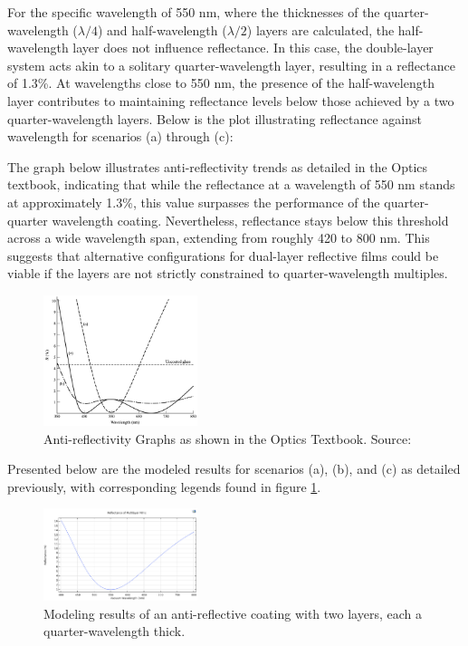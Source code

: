 For the specific wavelength of 550 nm, where the thicknesses of the quarter-wavelength ($\lambda/4$) and half-wavelength ($\lambda/2$) layers are calculated, the half-wavelength layer does not influence reflectance. In this case, the double-layer system acts akin to a solitary quarter-wavelength layer, resulting in a reflectance of 1.3\%. At wavelengths close to 550 nm, the presence of the half-wavelength layer contributes to maintaining reflectance levels below those achieved by a two quarter-wavelength layers. Below is the plot illustrating reflectance against wavelength for scenarios (a) through (c):

The graph below illustrates anti-reflectivity trends as detailed in the Optics textbook, indicating that while the reflectance at a wavelength of 550 nm stands at approximately 1.3\%, this value surpasses the performance of the quarter-quarter wavelength coating. Nevertheless, reflectance stays below this threshold across a wide wavelength span, extending from roughly 420 to 800 nm. This suggests that alternative configurations for dual-layer reflective films could be viable if the layers are not strictly constrained to quarter-wavelength multiples.

\begin{figure}[ht!]
  \centering
  \includegraphics[width=0.4\textwidth]{Chapters/Figures/Chapter 4 Figures/Antireflectivity Graphs in the Optics Book.png}
  \caption{Anti-reflectivity Graphs as shown in the Optics Textbook. Source: \cite{pedrotti_introduction_2007}}
  \label{fig:antireflectivity graphs in the Optics book}
\end{figure}

Presented below are the modeled results for scenarios (a), (b), and (c) as detailed previously, with corresponding legends found in figure \ref{fig:antireflectivity graphs in the Optics book}.

\begin{figure}[ht!]
  \centering
  \includegraphics[width=0.4\textwidth]{Chapters/Figures/Chapter 4 Figures/Antireflective Figure a.png}
  \caption{Modeling results of an anti-reflective coating with two layers, each a quarter-wavelength thick.}
  \label{fig:Antireflective Figure a}
\end{figure}

